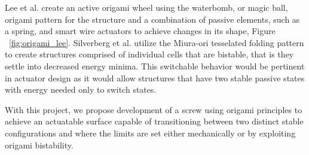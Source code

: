 


Lee et al.\cite{Lee2013} create an active origami wheel using the waterbomb, or magic ball, origami pattern for the structure and a combination of passive elements, such as a spring, and smart wire actuators to achieve changes in its shape, Figure ~\ref{fig:origami_lee}. Silverberg et al. \cite{Silverberg2015} utilize the Miura-ori tesselated folding pattern to create structures comprised of individual cells that are bistable, that is they settle into decreased energy minima. This switchable behavior would be pertinent in actuator design as it would allow structures that have two stable passive states with energy needed only to switch states. 



With this project, we propose development of a screw using origami principles to achieve an actuatable surface capable of transitioning between two distinct stable configurations and where the limits are set either mechanically or by exploiting origami bistability. 

